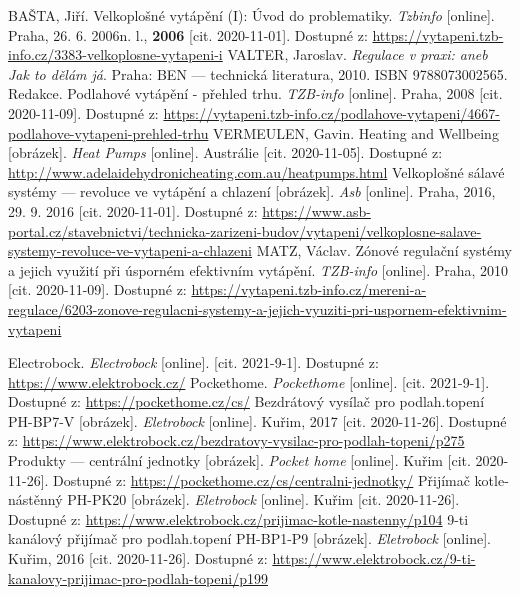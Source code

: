 \begin{thebibliography}{3}

BAŠTA, Jiří. Velkoplošné vytápění (I): Úvod do problematiky. \textit{Tzbinfo} [online]. Praha, 26. 6. 2006n. l., \textbf{2006} [cit. 2020-11-01]. Dostupné z: \url{https://vytapeni.tzb-info.cz/3383-velkoplosne-vytapeni-i}
VALTER, Jaroslav. \textit{Regulace v praxi: aneb Jak to dělám já}. Praha: BEN --- technická literatura, 2010. ISBN 9788073002565.
Redakce. Podlahové vytápění - přehled trhu. \textit{TZB-info} [online]. Praha, 2008 [cit. 2020-11-09]. Dostupné z: \url{https://vytapeni.tzb-info.cz/podlahove-vytapeni/4667-podlahove-vytapeni-prehled-trhu}
VERMEULEN, Gavin. Heating and Wellbeing [obrázek]. \textit{Heat Pumps} [online]. Austrálie [cit. 2020-11-05]. Dostupné z: \url{http://www.adelaidehydronicheating.com.au/heatpumps.html}
Velkoplošné sálavé systémy --- revoluce ve vytápění a chlazení [obrázek]. \textit{Asb} [online]. Praha, 2016, 29. 9. 2016 [cit. 2020-11-01]. Dostupné z: \url{https://www.asb-portal.cz/stavebnictvi/technicka-zarizeni-budov/vytapeni/velkoplosne-salave-systemy-revoluce-ve-vytapeni-a-chlazeni}
MATZ, Václav. Zónové regulační systémy a jejich využití při úsporném efektivním vytápění. \textit{TZB-info} [online]. Praha, 2010 [cit. 2020-11-09]. Dostupné z: \url{https://vytapeni.tzb-info.cz/mereni-a-regulace/6203-zonove-regulacni-systemy-a-jejich-vyuziti-pri-uspornem-efektivnim-vytapeni}



Electrobock. \textit{Electrobock} [online]. [cit. 2021-9-1]. Dostupné z: \url{https://www.elektrobock.cz/}
Pockethome.  \textit{Pockethome} [online]. [cit. 2021-9-1]. Dostupné z: \url{https://pockethome.cz/cs/}
Bezdrátový vysílač pro podlah.topení PH-BP7-V [obrázek]. \textit{Eletrobock} [online]. Kuřim, 2017 [cit. 2020-11-26]. Dostupné z: \url{https://www.elektrobock.cz/bezdratovy-vysilac-pro-podlah-topeni/p275}
Produkty --- centrální jednotky [obrázek]. \textit{Pocket home} [online]. Kuřim [cit. 2020-11-26]. Dostupné z: \url{https://pockethome.cz/cs/centralni-jednotky/}
Přijímač kotle-nástěnný PH-PK20 [obrázek]. \textit{Eletrobock} [online]. Kuřim [cit. 2020-11-26]. Dostupné z: \url{https://www.elektrobock.cz/prijimac-kotle-nastenny/p104}
9-ti kanálový přijímač pro podlah.topení PH-BP1-P9 [obrázek]. \textit{Eletrobock} [online]. Kuřim, 2016 [cit. 2020-11-26]. Dostupné z: \url{https://www.elektrobock.cz/9-ti-kanalovy-prijimac-pro-podlah-topeni/p199}


\end{thebibliography}
